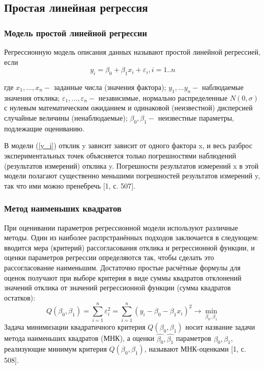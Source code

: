 \documentclass[a4paper]{article}
\begin{document}
    \subsection{Простая линейная регрессия}
            \subsubsection{Модель простой линейной регрессии}
            \noindent Регрессионную модель описания данных называют простой линейной регрессией, если
            \begin{equation}
                y_{i} = \beta_{0} + \beta_{1}x_{i} + \varepsilon_{i},  i = 1..n
                \label{y_i}
            \end{equation}

            \noindent где $x_1,...,x_n - $ заданные числа (значения фактора);
            $y_1,...y_n - $ наблюдаемые значения отклика;
            $\varepsilon_1,...,\varepsilon_n - $ независимые, нормально распределенные $N(0, \sigma)$ с нулевым математическим ожиданием и одинаковой (неизвестной) дисперсией случайные величины (ненаблюдаемые);
            $\beta_0, \beta_1 - $ неизвестные параметры, подлежащие оцениванию.

            \noindent В модели (\ref{y_i}) отклик y зависит зависит от одного фактора x, и весь разброс экспериментальных точек объясняется только погрешностями наблюдений (результатов измерений) отклика y. Погрешности результатов измерений x в этой модели полагают существенно меньшими погрешностей результатов измерений y, так что ими можно пренебречь [1, с. 507].

            \subsubsection{Метод наименьших квадратов}
            \noindent При оценивании параметров регрессионной модели используют различные методы. Один из наиболее распрстранённых подходов заключается в следующем: вводится мера (критерий) рассогласования отклика и регрессионной функции, и оценки параметров регрессии определяются так, чтобы сделать это рассогласование наименьшим. Достаточно простые расчётные формулы для оценок получают при выборе критерия в виде суммы квадратов отклонений значений отклика от значений регрессионной функции (сумма квадратов остатков):
            \begin{equation}
                Q(\beta_{0}, \beta_{1}) = \sum_{i=1}^{n}{\varepsilon_{i}^{2}} =
                \sum_{i=1}^{n}{(y_{i} - \beta_{0} - \beta_{1}x_{i})^{2}}\rightarrow \min_{\beta_{0}, \beta_{1}}
                \label{Q_beta}
            \end{equation}
            Задача минимизации квадратичного критерия $Q(\beta_0, \beta_1)$ носит название задачи метода наименьших квадратов (МНК), а оценки $\hat{\beta_0}, \hat{\beta_1}$ параметров $\beta_0, \beta_1$, реализующие минимум критерия $Q(\beta_0, \beta_1)$, называют МНК-оценками [1, с. 508].
\end{document}
